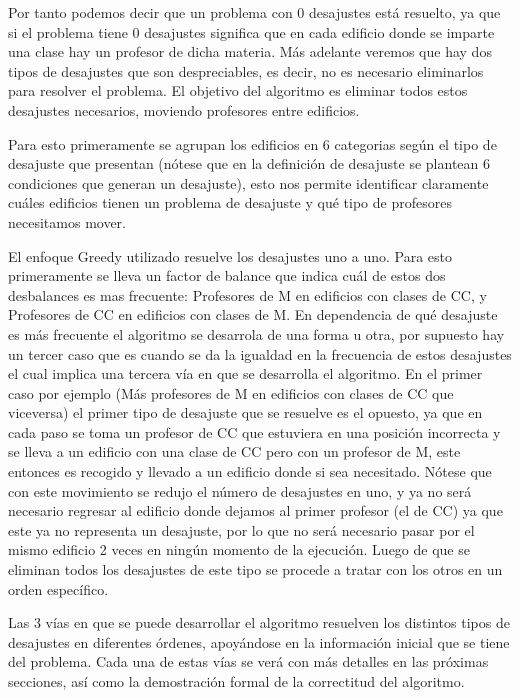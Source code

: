 \documentclass[11pt]{article}
\begin{document}
    Por tanto podemos decir que un problema con 0 desajustes está resuelto, ya que si el problema tiene
    0 desajustes significa que en cada edificio donde se imparte una clase hay un profesor de dicha materia.
    Más adelante veremos que hay dos tipos de desajustes que son despreciables, es decir, no es necesario
    eliminarlos para resolver el problema. El objetivo del algoritmo es eliminar todos estos desajustes necesarios, 
    moviendo profesores entre edificios.

    Para esto primeramente se agrupan los edificios en 6 categorias según el tipo de desajuste que presentan
    (nótese que en la definición de desajuste se plantean 6 condiciones que generan un desajuste), esto nos 
    permite identificar claramente cuáles edificios tienen un problema de desajuste y qué tipo de profesores 
    necesitamos mover.

    El enfoque Greedy utilizado resuelve los desajustes uno a uno. Para esto primeramente se lleva un factor
    de balance que indica cuál de estos dos desbalances es mas frecuente: Profesores de M en edificios con clases 
    de CC, y Profesores de CC en edificios con clases de M. En dependencia de qué desajuste es más frecuente el 
    algoritmo se desarrola de una forma u otra, por supuesto hay un tercer caso que es cuando se da la igualdad en 
    la frecuencia de estos desajustes el cual implica una tercera vía en que se desarrolla el algoritmo. En el primer 
    caso por ejemplo (Más profesores de M en edificios con clases de CC que viceversa) el primer tipo de desajuste
    que se resuelve es el opuesto, ya que en cada paso se toma un profesor de CC que estuviera en una posición incorrecta 
    y se lleva a un edificio con una clase de CC pero con un profesor de M, este entonces es recogido y llevado a un edificio 
    donde si sea necesitado. Nótese que con este movimiento se redujo el número de desajustes en uno, y ya no será necesario 
    regresar al edificio donde dejamos al primer profesor (el de CC) ya que este ya no representa un desajuste, por lo que no 
    será necesario pasar por el mismo edificio 2 veces en ningún momento de la ejecución. Luego de que se eliminan todos 
    los desajustes de este tipo se procede a tratar con los otros en un orden específico. 
    
    Las 3 vías en que se puede desarrollar el algoritmo resuelven los distintos tipos de desajustes en diferentes 
    órdenes, apoyándose en la información inicial que se tiene del problema. Cada una de estas vías se verá con
    más detalles en las próximas secciones, así como la demostración formal de la correctitud del algoritmo.
\end{document}
